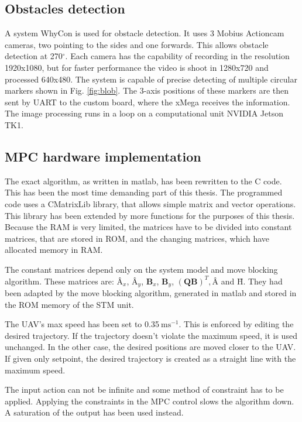 \documentclass[a4paper,11pt,titlepage]{article}
\newcommand{\jed}[1]{\ensuremath{~\mathrm{#1}}}
\begin{document}
\subsection{Obstacles detection}
A system WhyCon\cite{whycon_icar}\cite{whycon_jint} is used for obstacle detection. It uses 3 Mobius Actioncam cameras, two pointing to the sides and one forwards. This allows obstacle detection at 270$^\circ$. Each camera has the capability of recording in the resolution 1920x1080, but for faster performance the video is shoot in 1280x720 and processed 640x480. The system is capable of precise detecting of multiple circular markers shown in Fig. \ref{fig:blob}. The 3-axis positions of these markers are then sent by UART to the custom board, where the xMega receives the information. The image processing runs in a loop on a computational unit NVIDIA Jetson TK1.

\subsection{MPC hardware implementation}

The exact algorithm, as written in matlab, has been rewritten to the C code. This has been the most time demanding part of this thesis. The programmed code uses a CMatrixLib library, that allows simple matrix and vector operations. This library has been extended by more functions for the purposes of this thesis. Because the RAM is very limited, the matrices have to be divided into constant matrices, that are stored in ROM, and the changing matrices, which have allocated memory in RAM.

The constant matrices depend only on the system model and move blocking algorithm. These matrices are: $\textbf{\^A}_x$, $\textbf{\^A}_y$, $\textbf{\^B}_x$, $\textbf{\^B}_y$, $(\textbf{\^Q}\textbf{\^B})^T, \textbf{\^A}$ and $\textbf{\^H}$. They had been adapted by the move blocking algorithm, generated in matlab and stored in the ROM memory of the STM unit. 

The UAV's max speed has been set to 0.35\jed{ms^{-1}}. This is enforced by editing the desired trajectory. If the trajectory doesn't violate the maximum speed, it is used unchanged. In the other case, the desired positions are moved closer to the UAV. If given only setpoint, the desired trajectory is created as a straight line with the maximum speed. 

The input action can not be infinite and some method of constraint has to be applied. Applying the constraints in the MPC control slows the algorithm down. A saturation of the output has been used instead.
\end{document}
